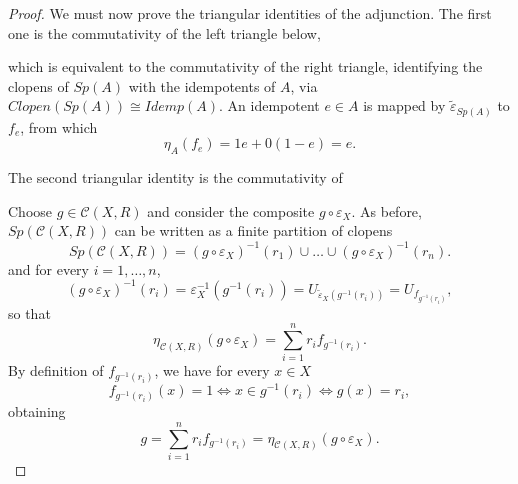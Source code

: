 \begin{proposition}
\begin{proof}
        We must now prove the triangular identities of the adjunction. The first one is the commutativity of the left triangle below,
        \begin{center}
        \end{center}
        which is equivalent to the commutativity of the right triangle, identifying the clopens of $Sp(A)$ with the idempotents of $A$, via $Clopen(Sp(A))\cong Idemp(A)$. An idempotent $e\in A$ is mapped by $\tilde{\varepsilon}_{Sp(A)}$ to $f_e$, from which
        \[ \eta_A(f_e) = 1e + 0(1-e) = e. \]

        The second triangular identity is the commutativity of 
        \begin{center}
        \end{center}
        Choose $g\in \mathcal{C}(X,R)$ and consider the composite $g\circ\varepsilon_X$. As before, $Sp(\mathcal{C}(X,R))$ can be written as a finite partition of clopens
        \[ Sp(\mathcal{C}(X,R)) = (g\circ\varepsilon_X)^{-1}(r_1)\cup\dots\cup (g\circ\varepsilon_X)^{-1}(r_n).  \]
        and for every $i=1,\dots,n$,
        \[  (g\circ\varepsilon_X)^{-1}(r_i) = \varepsilon_X^{-1}(g^{-1}(r_i)) = U_{\tilde{\varepsilon}_{X}(g^{-1}(r_i))} = U_{f_{g^{-1}(r_i)}}, \]
        so that
        \[ \eta_{\mathcal{C}(X,R)}(g\circ\varepsilon_X) = \sum_{i=1}^{n}r_if_{g^{-1}(r_i)}. \]
        By definition of $f_{g^{-1}(r_i)}$, we have for every $x\in X$
        \[ f_{g^{-1}(r_i)}(x)=1\iff x\in g^{-1}(r_i) \iff g(x) = r_i, \]
        obtaining
        \[ g = \sum_{i=1}^nr_if_{g^{-1}(r_i)} = \eta_{\mathcal{C}(X,R)}(g\circ\varepsilon_X). \]
    \end{proof}
\end{proposition}

